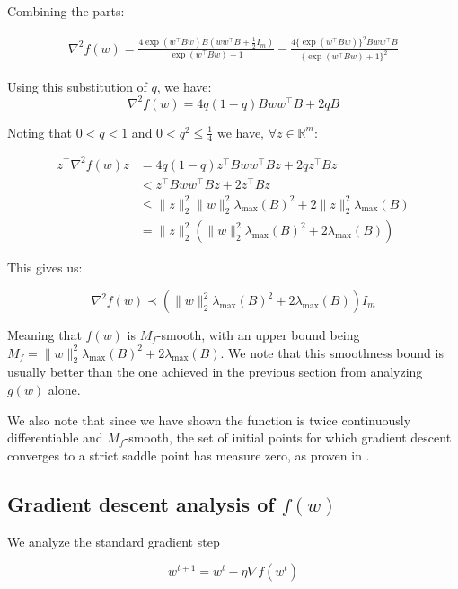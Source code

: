 \documentclass[11pt]{article}
\begin{document}
Combining the parts:

\begin{align*}
    \nabla^2 f(w) = \frac{4 \exp(w^{\top}Bw)B(ww^{\top}B + \frac{1}{2}I_m)}{\exp(w^{\top}Bw) + 1} - \frac{4 \{\exp(w^{\top}Bw)\}^2 Bww^{\top}B }{\{\exp(w^{\top}Bw) + 1\}^2}
\end{align*}

Using this substitution of $q$,  we have:
\begin{equation}
    \nabla^2 f(w) = 4q(1-q)Bww^{\top}B + 2qB
\end{equation}

Noting that $0 < q < 1$ and $0 < q^2 \leq \frac{1}{4}$ we have, $\forall z \in \mathbb{R}^m$:

\begin{align*}
z^{\top} \nabla^2 f(w) z 
&= 4q(1-q) z^{\top} Bww^{\top}B z + 2q z^{\top} B z \\
&< z^{\top} Bww^{\top}B z + 2 z^{\top} B z \\
&\leq \|z\|_2^2 \|w\|_2^2 \lambda_{\max} (B)^2 + 2 \|z\|_2^2 \lambda_{\max} (B) \\
&= \|z\|_2^2 ( \|w\|_2^2 \lambda_{\max} (B)^2 + 2 \lambda_{\max} (B) ) 
\end{align*}

This gives us:

\begin{equation}
    \nabla^2 f(w) \prec ( \|w\|_2^2 \lambda_{\max} (B)^2 + 2 \lambda_{\max} (B)) I_m
\end{equation}

Meaning that $f(w)$ is $M_f$-smooth, with an upper bound being $M_f = \|w\|_2^2 \lambda_{\max} (B)^2 + 2 \lambda_{\max} (B)$. We note that this smoothness bound is usually better than the one achieved in the previous section from analyzing $g(w)$ alone.

We also note that since we have shown the function is twice continuously differentiable and $M_f$-smooth, the set of initial points for which gradient descent converges to a strict saddle point has measure zero, as proven in \cite{lee_gradient_2016}.

\subsection{Gradient descent analysis of $f(w)$}
\label{sec:grad_descent}

We analyze the standard gradient step

\begin{equation}
    w^{t+1} = w^t - \eta \nabla f(w^t)
\end{equation}
\end{document}
